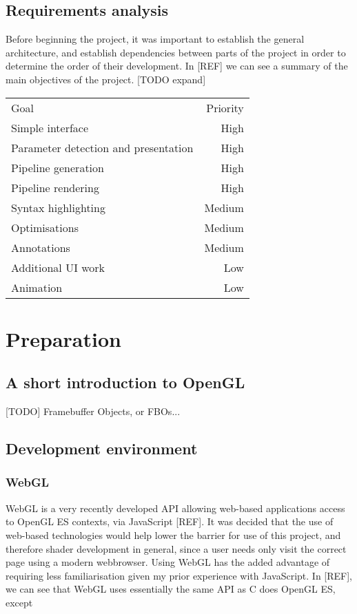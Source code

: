 \documentclass[12pt,twoside,notitlepage]{report}
\begin{document}
\section{Requirements analysis}
Before beginning the project, it was important to establish the general architecture, and establish dependencies between parts of the project in order to determine the order of their development. In [REF] we can see a summary of the main objectives of the project. [TODO expand]
\begin{table}
\begin{tabular}{l | r}
Goal & Priority \\
Simple interface & High \\
Parameter detection and presentation & High \\
Pipeline generation & High \\
Pipeline rendering & High \\
Syntax highlighting & Medium \\
Optimisations & Medium \\
Annotations & Medium \\
Additional UI work & Low \\
Animation & Low \\
\end{tabular}
\end{table}


\cleardoublepage
\chapter{Preparation}
\section{A short introduction to OpenGL}
[TODO]
Framebuffer Objects, or FBOs...

\section{Development environment}
\subsection*{WebGL}
WebGL is a very recently developed API allowing web-based applications access to OpenGL ES contexts, via JavaScript [REF]. It was decided that the use of web-based technologies would help lower the barrier for use of this project, and therefore shader development in general, since a user needs only visit the correct page using a modern webbrowser. Using WebGL has the added advantage of requiring less familiarisation given my prior experience with JavaScript. In [REF], we can see that WebGL uses essentially the same API as C does OpenGL ES, except 
\end{document}
